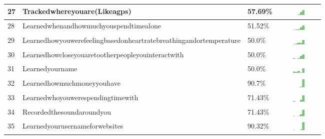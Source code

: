 \begin{table}[t]
\begin{center}
\begin{tabular}{| p{0.5cm} | p{7cm} | p{1cm} | c |}
27 & Trackedwhereyouare(Likeagps) & 57.69\% & \includegraphics[width = 2cm, height = 0.5cm]{../trackedwhereyouare(likeaGPS)FRIENDS} \\ \hline 
28 & Learnedwhenandhowmuchyouspendtimealone & 51.52\% & \includegraphics[width = 2cm, height = 0.5cm]{../learnedwhenandhowmuchyouspendtimealoneFRIENDS} \\ \hline 
29 & Learnedhowyouwerefeelingbasedonheartratebreathingandortemperature & 50.0\% & \includegraphics[width = 2cm, height = 0.5cm]{../learnedhowyouwerefeelingbasedonheartratebreathingandortemperatureFRIENDS} \\ \hline 
30 & Learnedhowcloseyouaretootherpeopleyouinteractwith & 50.0\% & \includegraphics[width = 2cm, height = 0.5cm]{../learnedhowcloseyouaretootherpeopleyouinteractwithFRIENDS} \\ \hline 
31 & Learnedyourname & 50.0\% & \includegraphics[width = 2cm, height = 0.5cm]{../learnedyournameFRIENDS} \\ \hline 
32 & Learnedhowmuchmoneyyouhave & 90.7\% & \includegraphics[width = 2cm, height = 0.5cm]{../learnedhowmuchmoneyyouhaveFRIENDS} \\ \hline 
33 & Learnedwhoyouwerespendingtimewith & 71.43\% & \includegraphics[width = 2cm, height = 0.5cm]{../learnedwhoyouwerespendingtimewithFRIENDS} \\ \hline 
34 & Recordedthesoundaroundyou & 71.43\% & \includegraphics[width = 2cm, height = 0.5cm]{../recordedthesoundaroundyouFRIENDS} \\ \hline 
35 & Learnedyourusernameforwebsites & 90.32\% & \includegraphics[width = 2cm, height = 0.5cm]{../learnedyourusernameforwebsitesFRIENDS} \\ \hline 

\end{tabular}
\end{center}
\end{table}
